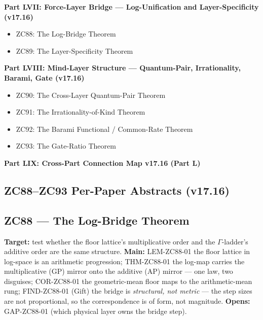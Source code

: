 \documentclass[11pt, a4paper]{article}
\begin{document}
\begin{contentsbox}[title={Part L --- Part and Section Headers}]
\textbf{Part LVII: Force-Layer Bridge --- Log-Unification and
  Layer-Specificity (v17.16)}
\begin{itemize}[noitemsep,leftmargin=1.5em]
  \item ZC88: The Log-Bridge Theorem
  \item ZC89: The Layer-Specificity Theorem
\end{itemize}

\textbf{Part LVIII: Mind-Layer Structure --- Quantum-Pair, Irrationality,
  Barami, Gate (v17.16)}
\begin{itemize}[noitemsep,leftmargin=1.5em]
  \item ZC90: The Cross-Layer Quantum-Pair Theorem
  \item ZC91: The Irrationality-of-Kind Theorem
  \item ZC92: The Barami Functional / Common-Rate Theorem
  \item ZC93: The Gate-Ratio Theorem
\end{itemize}

\textbf{Part LIX: Cross-Part Connection Map v17.16 (Part L)}
\end{contentsbox}

\subsection*{ZC88--ZC93 Per-Paper Abstracts (v17.16)}

\subsection{ZC88 --- The Log-Bridge Theorem}
\begin{zcbox}[title={ZC88: THM-ZC88-01 --- Log-Bridge + FIND-ZC88-01 (Gift)}]
\sloppy
\textbf{Target:} test whether the floor lattice's multiplicative order and
the $\Gamma$-ladder's additive order are the same structure.
\textbf{Main:} LEM-ZC88-01 the floor lattice in log-space is an arithmetic
progression; THM-ZC88-01 the log-map carries the multiplicative (GP) mirror
onto the additive (AP) mirror --- one law, two disguises; COR-ZC88-01 the
geometric-mean floor maps to the arithmetic-mean rung; FIND-ZC88-01 (Gift)
the bridge is \emph{structural, not metric} --- the step sizes are not
proportional, so the correspondence is of form, not magnitude.
\textbf{Opens:} GAP-ZC88-01 (which physical layer owns the bridge step).
\end{zcbox}
\end{document}
